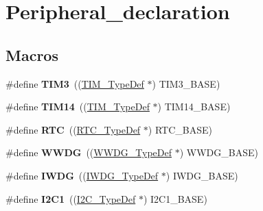 \hypertarget{group___peripheral__declaration}{}\section{Peripheral\+\_\+declaration}
\label{group___peripheral__declaration}
\subsection*{Macros}
\begin{DoxyCompactItemize}
\item 
\mbox{\label{group___peripheral__declaration_ga61ee4c391385607d7af432b63905fcc9}} 
\#define {\bfseries T\+I\+M3}~((\hyperlink{struct_t_i_m___type_def}{T\+I\+M\+\_\+\+Type\+Def} $\ast$) T\+I\+M3\+\_\+\+B\+A\+SE)
\item 
\mbox{\label{group___peripheral__declaration_ga2dd30f46fad69dd73e1d8941a43daffe}} 
\#define {\bfseries T\+I\+M14}~((\hyperlink{struct_t_i_m___type_def}{T\+I\+M\+\_\+\+Type\+Def} $\ast$) T\+I\+M14\+\_\+\+B\+A\+SE)
\item 
\mbox{\label{group___peripheral__declaration_ga5359a088f5d8b20ce74d920e46059304}} 
\#define {\bfseries R\+TC}~((\hyperlink{struct_r_t_c___type_def}{R\+T\+C\+\_\+\+Type\+Def} $\ast$) R\+T\+C\+\_\+\+B\+A\+SE)
\item 
\mbox{\label{group___peripheral__declaration_ga9821fd01757986612ddb8982e2fe27f1}} 
\#define {\bfseries W\+W\+DG}~((\hyperlink{struct_w_w_d_g___type_def}{W\+W\+D\+G\+\_\+\+Type\+Def} $\ast$) W\+W\+D\+G\+\_\+\+B\+A\+SE)
\item 
\mbox{\label{group___peripheral__declaration_gad16b79dd94ee85d261d08a8ee94187e7}} 
\#define {\bfseries I\+W\+DG}~((\hyperlink{struct_i_w_d_g___type_def}{I\+W\+D\+G\+\_\+\+Type\+Def} $\ast$) I\+W\+D\+G\+\_\+\+B\+A\+SE)
\item 
\mbox{\label{group___peripheral__declaration_gab45d257574da6fe1f091cc45b7eda6cc}} 
\#define {\bfseries I2\+C1}~((\hyperlink{struct_i2_c___type_def}{I2\+C\+\_\+\+Type\+Def} $\ast$) I2\+C1\+\_\+\+B\+A\+SE)

\end{DoxyCompactItemize}
